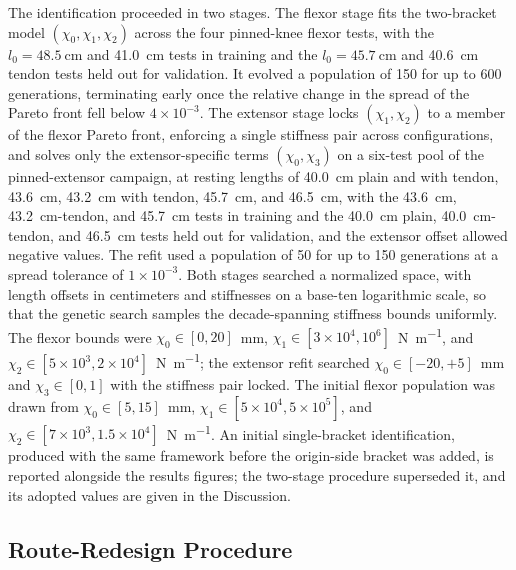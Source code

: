 \documentclass[utf8]{FrontiersinHarvard} %
\begin{document}
The identification proceeded in two stages. The flexor stage fits the two-bracket model $(\chi_{0}, \chi_{1}, \chi_{2})$ across the four pinned-knee flexor tests, with the $l_{0}=\qty{48.5}{\cm}$ and \qty{41.0}{\cm} tests in training and the $l_{0}=\qty{45.7}{\cm}$ and \qty{40.6}{\cm} tendon tests held out for validation. It evolved a population of 150 for up to 600 generations, terminating early once the relative change in the spread of the Pareto front fell below $4\times10^{-3}$. The extensor stage locks $(\chi_{1}, \chi_{2})$ to a member of the flexor Pareto front, enforcing a single stiffness pair across configurations, and solves only the extensor-specific terms $(\chi_{0}, \chi_{3})$ on a six-test pool of the pinned-extensor campaign, at resting lengths of \qty{40.0}{\cm} plain and with tendon, \qty{43.6}{\cm}, \qty{43.2}{\cm} with tendon, \qty{45.7}{\cm}, and \qty{46.5}{\cm}, with the \qty{43.6}{\cm}, \qty{43.2}{\cm}-tendon, and \qty{45.7}{\cm} tests in training and the \qty{40.0}{\cm} plain, \qty{40.0}{\cm}-tendon, and \qty{46.5}{\cm} tests held out for validation, and the extensor offset allowed negative values. The refit used a population of 50 for up to 150 generations at a spread tolerance of $1\times10^{-3}$. Both stages searched a normalized space, with length offsets in centimeters and stiffnesses on a base-ten logarithmic scale, so that the genetic search samples the decade-spanning stiffness bounds uniformly. The flexor bounds were $\chi_{0} \in [0, 20]$~\si{\milli\metre}, $\chi_{1} \in [3\times10^{4}, 10^{6}]$~\si{\N\per\metre}, and $\chi_{2} \in [5\times10^{3}, 2\times10^{4}]$~\si{\N\per\metre}; the extensor refit searched $\chi_{0} \in [-20, +5]$~\si{\milli\metre} and $\chi_{3} \in [0, 1]$ with the stiffness pair locked. The initial flexor population was drawn from $\chi_{0} \in [5, 15]$~\si{\milli\metre}, $\chi_{1} \in [5\times10^{4}, 5\times10^{5}]$, and $\chi_{2} \in [7\times10^{3}, 1.5\times10^{4}]$~\si{\N\per\metre}. An initial single-bracket identification, produced with the same framework before the origin-side bracket was added, is reported alongside the results figures; the two-stage procedure superseded it, and its adopted values are given in the Discussion.

\subsection{Route-Redesign Procedure}\label{sec:route_redesign}
\end{document}

